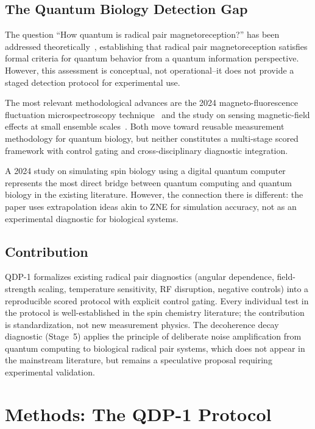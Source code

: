 \documentclass[preprint,amsmath,amssymb]{revtex4-2}
\begin{document}
\subsection{The Quantum Biology Detection Gap}

The question ``How quantum is radical pair magnetoreception?'' has been addressed theoretically~\cite{fay2020}, establishing that radical pair magnetoreception satisfies formal criteria for quantum behavior from a quantum information perspective. However, this assessment is conceptual, not operational--it does not provide a staged detection protocol for experimental use.

The most relevant methodological advances are the 2024 magneto-fluorescence fluctuation microspectroscopy technique~\cite{antill2025} and the study on sensing magnetic-field effects at small ensemble scales~\cite{kerpal2019}. Both move toward reusable measurement methodology for quantum biology, but neither constitutes a multi-stage scored framework with control gating and cross-disciplinary diagnostic integration.

A 2024 study on simulating spin biology using a digital quantum computer~\cite{alvarez2024} represents the most direct bridge between quantum computing and quantum biology in the existing literature. However, the connection there is different: the paper uses extrapolation ideas akin to ZNE for simulation accuracy, not as an experimental diagnostic for biological systems.

\subsection{Contribution}

QDP-1 formalizes existing radical pair diagnostics (angular dependence, field-strength scaling, temperature sensitivity, RF disruption, negative controls) into a reproducible scored protocol with explicit control gating. Every individual test in the protocol is well-established in the spin chemistry literature; the contribution is standardization, not new measurement physics. The decoherence decay diagnostic (Stage~5) applies the principle of deliberate noise amplification from quantum computing to biological radical pair systems, which does not appear in the mainstream literature, but remains a speculative proposal requiring experimental validation.

\section{Methods: The QDP-1 Protocol}
\end{document}

